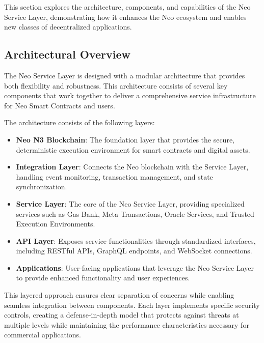 \documentclass{article}
\begin{document}
This section explores the architecture, components, and capabilities of the Neo Service Layer, demonstrating how it enhances the Neo ecosystem and enables new classes of decentralized applications.

\subsection{Architectural Overview}
\label{subsec:nsl-architecture}

The Neo Service Layer is designed with a modular architecture that provides both flexibility and robustness. This architecture consists of several key components that work together to deliver a comprehensive service infrastructure for Neo Smart Contracts and users.



The architecture consists of the following layers:

\begin{itemize}
    \item \textbf{Neo N3 Blockchain}: The foundation layer that provides the secure, deterministic execution environment for smart contracts and digital assets.
    
    \item \textbf{Integration Layer}: Connects the Neo blockchain with the Service Layer, handling event monitoring, transaction management, and state synchronization.
    
    \item \textbf{Service Layer}: The core of the Neo Service Layer, providing specialized services such as Gas Bank, Meta Transactions, Oracle Services, and Trusted Execution Environments.
    
    \item \textbf{API Layer}: Exposes service functionalities through standardized interfaces, including RESTful APIs, GraphQL endpoints, and WebSocket connections.
    
    \item \textbf{Applications}: User-facing applications that leverage the Neo Service Layer to provide enhanced functionality and user experiences.
\end{itemize}

This layered approach ensures clear separation of concerns while enabling seamless integration between components. Each layer implements specific security controls, creating a defense-in-depth model that protects against threats at multiple levels while maintaining the performance characteristics necessary for commercial applications.
\end{document}
